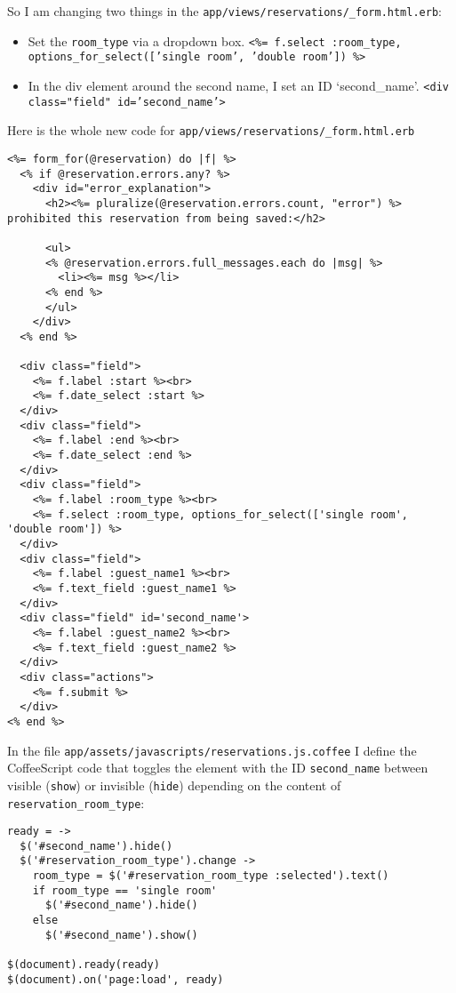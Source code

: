 \documentclass[a4paper]{book}
\begin{document}
So I am changing two things in the \texttt{app/views/reservations/\_form.html.erb}:

\begin{itemize}
\itemsep1pt\parskip0pt
\item
  Set the \texttt{room\_type} via a dropdown box. \texttt{\textless{}\%= f.select :room\_type,             options\_for\_select({[}'single room', 'double room'{]})             \%\textgreater{}}
\item
  In the div element around the second name, I set an ID `second\_name'. \texttt{\textless{}div class="field"             id='second\_name'\textgreater{}}
\end{itemize}

Here is the whole new code for \texttt{app/views/reservations/\_form.html.erb}

\begin{shaded}\begin{verbatim}
<%= form_for(@reservation) do |f| %>
  <% if @reservation.errors.any? %>
    <div id="error_explanation">
      <h2><%= pluralize(@reservation.errors.count, "error") %> prohibited this reservation from being saved:</h2>

      <ul>
      <% @reservation.errors.full_messages.each do |msg| %>
        <li><%= msg %></li>
      <% end %>
      </ul>
    </div>
  <% end %>

  <div class="field">
    <%= f.label :start %><br>
    <%= f.date_select :start %>
  </div>
  <div class="field">
    <%= f.label :end %><br>
    <%= f.date_select :end %>
  </div>
  <div class="field">
    <%= f.label :room_type %><br>
    <%= f.select :room_type, options_for_select(['single room', 'double room']) %>
  </div>
  <div class="field">
    <%= f.label :guest_name1 %><br>
    <%= f.text_field :guest_name1 %>
  </div>
  <div class="field" id='second_name'>
    <%= f.label :guest_name2 %><br>
    <%= f.text_field :guest_name2 %>
  </div>
  <div class="actions">
    <%= f.submit %>
  </div>
<% end %>
\end{verbatim}\end{shaded}

In the file \texttt{app/assets/javascripts/reservations.js.coffee} I define the CoffeeScript code that toggles the element with the ID \texttt{second\_name} between visible (\texttt{show}) or invisible (\texttt{hide}) depending on the content of \texttt{reservation\_room\_type}:

\begin{shaded}\begin{verbatim}
ready = ->
  $('#second_name').hide()
  $('#reservation_room_type').change ->
    room_type = $('#reservation_room_type :selected').text()
    if room_type == 'single room'
      $('#second_name').hide()
    else
      $('#second_name').show()

$(document).ready(ready)
$(document).on('page:load', ready)
\end{verbatim}\end{shaded}
\end{document}
